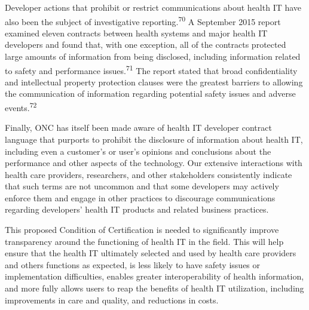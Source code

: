 \documentclass[twoside,11pt]{article}
\begin{document}


          Developer actions that prohibit or restrict communications about health IT have also been the subject of investigative reporting.\textsuperscript{70}
             A September 2015 report examined eleven contracts between health systems and major health IT developers and found that, with one exception, all of the contracts protected large amounts of information from being disclosed, including information related to safety and performance issues.\textsuperscript{71}
             The report stated that broad confidentiality and intellectual property protection clauses were the greatest barriers to allowing the communication of information regarding potential safety issues and adverse events.\textsuperscript{72}
            
          








          Finally, ONC has itself been made aware of health IT developer contract language that purports to prohibit the disclosure of information about health IT, including even a customer's or user's opinions and conclusions about the performance and other aspects of the technology. Our extensive interactions with health care providers, researchers, and other stakeholders consistently indicate that such terms are not uncommon and that some developers may actively enforce them and engage in other practices to discourage communications regarding developers' health IT products and related business practices.


          This proposed Condition of Certification is needed to significantly improve transparency around the functioning of health IT in the field. This will help ensure that the health IT ultimately selected and used by health care providers and others functions as expected, is less likely to have safety issues or implementation difficulties, enables greater interoperability of health information, and more fully allows users to reap the benefits of health IT utilization, including improvements in care and quality, and reductions in costs.
\end{document}
